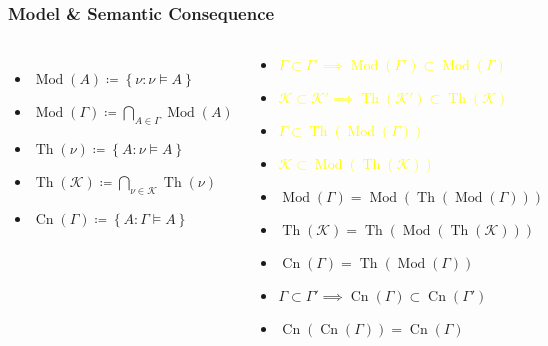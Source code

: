 \documentclass[UTF8,11pt,colorlinks,compress,openany]{beamer}%
\begin{document}
\begin{frame}\frametitle{Model \& Semantic Consequence}
\begin{columns}
	\begin{itemize}
		\item $\operatorname{Mod}(A)\coloneqq \left\{\nu: \nu\vDash A\right\}$
		\item $\operatorname{Mod}(\Gamma)\coloneqq \bigcap\limits_{A\in\Gamma}\operatorname{Mod}(A)$
		\item $\operatorname{Th}(\nu)\coloneqq \left\{A: \nu\vDash A\right\}$
		\item $\operatorname{Th}(\mathcal{K})\coloneqq \bigcap\limits_{\nu\in\mathcal{K}}\operatorname{Th}(\nu)$
		\item $\operatorname{Cn}(\Gamma)\coloneqq \left\{A: \Gamma\vDash A\right\}$
	\end{itemize}
	\begin{block}{}
		\begin{itemize}
			\item \textcolor{yellow}{$\Gamma\subset\Gamma'\implies\operatorname{Mod}(\Gamma')\subset\operatorname{Mod}(\Gamma)$}
			\item \textcolor{yellow}{$\mathcal{K}\subset\mathcal{K}'\implies\operatorname{Th}(\mathcal{K}')\subset\operatorname{Th}(\mathcal{K})$}
			\item \textcolor{yellow}{$\Gamma\subset\operatorname{Th}(\operatorname{Mod}(\Gamma))$}
			\item \textcolor{yellow}{$\mathcal{K}\subset\operatorname{Mod}(\operatorname{Th}(\mathcal{K}))$}
			\item $\operatorname{Mod}(\Gamma)=\operatorname{Mod}(\operatorname{Th}(\operatorname{Mod}(\Gamma)))$
			\item $\operatorname{Th}(\mathcal{K})=\operatorname{Th}(\operatorname{Mod}(\operatorname{Th}(\mathcal{K})))$
			\item $\operatorname{Cn}(\Gamma)=\operatorname{Th}(\operatorname{Mod}(\Gamma))$
			\item $\Gamma\subset\Gamma'\implies \operatorname{Cn}(\Gamma)\subset \operatorname{Cn}(\Gamma')$
			\item $\operatorname{Cn}(\operatorname{Cn}(\Gamma))=\operatorname{Cn}(\Gamma)$
		\end{itemize}
	\end{block}
\end{columns}
\end{frame}
\end{document}
